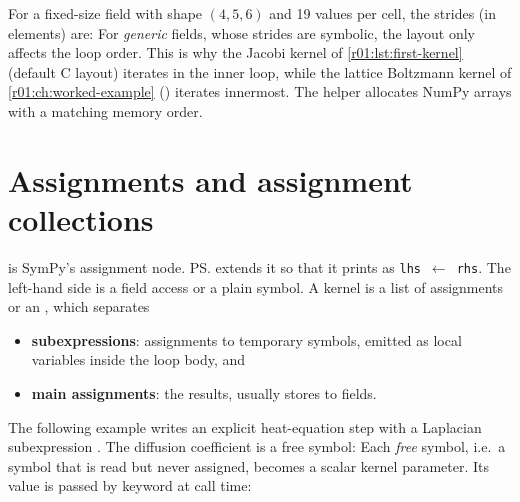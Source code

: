 For a fixed-size field with shape $(4,5,6)$ and 19 values per cell, the strides (in
elements) are:
For \emph{generic} fields, whose strides are symbolic, the layout only affects the loop
order. This is why the Jacobi kernel of \cref{r01:lst:first-kernel} (default C layout)
iterates  in the inner loop, while the lattice Boltzmann kernel of
\cref{r01:ch:worked-example} () iterates  innermost. The helper
 allocates NumPy
arrays with a matching memory order.

\section{Assignments and assignment collections}\label{r01:sec:assignments}

 is SymPy's assignment node. \ps{} extends it so that it
prints as \texttt{lhs}~$\leftarrow$~\texttt{rhs}. The left-hand side is a field access or a plain symbol. A
kernel is a list of assignments or an , which separates
\begin{itemize}
  \item \textbf{subexpressions}: assignments to temporary symbols, emitted as local
         variables inside the loop body, and
  \item \textbf{main assignments}: the results, usually stores to fields.
\end{itemize}
The following example writes an explicit heat-equation step with a Laplacian
subexpression . The diffusion coefficient  is a free symbol:
Each \emph{free} symbol, i.e.\ a symbol that is read but never assigned, becomes a
scalar kernel parameter. Its value is passed by keyword at call time:

